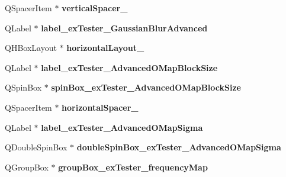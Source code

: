 \begin{DoxyCompactItemize}
\item 
\mbox{\label{class_ui___main_window_a9d5e3dc109715173ad67461b121c2b79}} 
Q\+Spacer\+Item $\ast$ {\bfseries vertical\+Spacer\+\_}
\item 
\mbox{\label{class_ui___main_window_a3b3138e213f22c0b26796c818d397949}} 
Q\+Label $\ast$ {\bfseries label\+\_\+ex\+Tester\+\_\+\+Gaussian\+Blur\+Advanced}
\item 
\mbox{\label{class_ui___main_window_a2cc82cfd5eb11ce1c3763e9e548a4e5d}} 
Q\+H\+Box\+Layout $\ast$ {\bfseries horizontal\+Layout\+\_}
\item 
\mbox{\label{class_ui___main_window_a4a215d197dfd69fa2c098d298695dd25}} 
Q\+Label $\ast$ {\bfseries label\+\_\+ex\+Tester\+\_\+\+Advanced\+O\+Map\+Block\+Size}
\item 
\mbox{\label{class_ui___main_window_a1875b418cf4a637b762dc45dd17715a0}} 
Q\+Spin\+Box $\ast$ {\bfseries spin\+Box\+\_\+ex\+Tester\+\_\+\+Advanced\+O\+Map\+Block\+Size}
\item 
\mbox{\label{class_ui___main_window_a482e23eb73c50451a16ca22e49b46686}} 
Q\+Spacer\+Item $\ast$ {\bfseries horizontal\+Spacer\+\_}
\item 
\mbox{\label{class_ui___main_window_a6548b54288c2eaa9049ce225a259125d}} 
Q\+Label $\ast$ {\bfseries label\+\_\+ex\+Tester\+\_\+\+Advanced\+O\+Map\+Sigma}
\item 
\mbox{\label{class_ui___main_window_abdad29216ae6788efc0d7a41af568ee8}} 
Q\+Double\+Spin\+Box $\ast$ {\bfseries double\+Spin\+Box\+\_\+ex\+Tester\+\_\+\+Advanced\+O\+Map\+Sigma}
\item 
\mbox{\label{class_ui___main_window_a9b6c7942c1d84197be90ca276d6393e4}} 
Q\+Group\+Box $\ast$ {\bfseries group\+Box\+\_\+ex\+Tester\+\_\+frequency\+Map}
\item 
\mbox{\label{class_ui___main_window_ae33ddf978a609382fb1c982a7550314b}} 

\end{DoxyCompactItemize}
